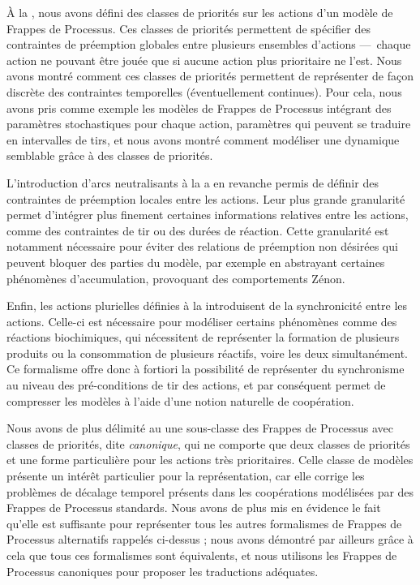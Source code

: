 À la , nous avons défini des classes de priorités sur les actions
d'un modèle de Frappes de Processus.
Ces classes de priorités permettent de spécifier des contraintes de préemption globales
entre plusieurs ensembles d'actions ---~chaque action ne pouvant être jouée que si
aucune action plus prioritaire ne l'est.
Nous avons montré comment ces classes de priorités permettent de représenter de façon
discrète des contraintes temporelles (éventuellement continues).
Pour cela, nous avons pris comme exemple les modèles de Frappes de Processus intégrant
des paramètres stochastiques pour chaque action,
paramètres qui peuvent se traduire en intervalles de tirs,
et nous avons montré comment modéliser une dynamique semblable grâce à des classes de priorités.

L'introduction d'arcs neutralisants à la  a en revanche permis de définir
des contraintes de préemption locales entre les actions.
Leur plus grande granularité permet d'intégrer plus finement certaines informations
relatives entre les actions, comme des contraintes de tir ou des durées de réaction.
Cette granularité est notamment nécessaire pour éviter des relations de préemption
non désirées qui peuvent bloquer des parties du modèle,
par exemple en abstrayant certaines phénomènes d'accumulation,
provoquant des comportements Zénon.

Enfin, les actions plurielles définies à la  introduisent de la
synchronicité entre les actions.
Celle-ci est nécessaire pour modéliser certains phénomènes comme des réactions biochimiques,
qui nécessitent de représenter la formation de plusieurs produits ou la consommation de plusieurs
réactifs, voire les deux simultanément.
Ce formalisme offre donc à fortiori la possibilité de représenter du synchronisme au niveau des
pré-conditions de tir des actions, et par conséquent permet de compresser les modèles
à l'aide d'une notion naturelle de coopération.

\myskip

Nous avons de plus délimité au  une sous-classe des Frappes de Processus
avec classes de priorités, dite \emph{canonique},
qui ne comporte que deux classes de priorités et une forme particulière pour les actions
très prioritaires.
Celle classe de modèles présente un intérêt particulier pour la représentation,
car elle corrige les problèmes de décalage temporel présents
dans les coopérations modélisées par des Frappes de Processus standards.
Nous avons de plus mis en évidence le fait qu'elle est suffisante pour représenter tous
les autres formalismes de Frappes de Processus alternatifs rappelés ci-dessus ;
nous avons démontré par ailleurs grâce à cela que tous ces formalismes sont équivalents,
et nous utilisons les Frappes de Processus canoniques pour proposer
les traductions adéquates.

